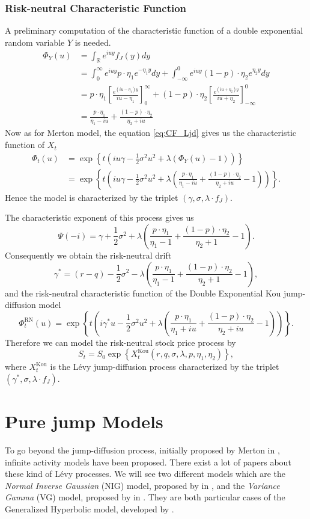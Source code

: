 \subsubsection*{Risk-neutral Characteristic Function}
A preliminary computation of the characteristic function of a double exponential random variable $Y$ is needed.
\begin{align*}
\Phi_Y(u)&=\int_\mathbb{R} e^{iuy}f_J(y) dy\\
&=\int_0^\infty e^{iuy}p\cdot \eta_1e^{-\eta_1 y}dy + \int_{-\infty}^0e^{iuy}(1-p)\cdot\eta_2e^{\eta_2 y}dy\\
&= p\cdot\eta_1\left[\frac{e^{(iu-\eta_1)y}}{iu-\eta_1}\right]_0^\infty+(1-p)\cdot\eta_2\left[\frac{e^{(iu+\eta_2)y}}{iu+\eta_2}\right]_{-\infty}^0\\
&=\frac{p\cdot\eta_1}{\eta_1-iu}+\frac{(1-p)\cdot\eta_2}{\eta_2+iu}
\end{align*}
Now as for Merton model, the equation \eqref{eq:CF_Ljd} gives us the characteristic function of $X_t$
\begin{align*}
\Phi_t(u)&=\exp\left\{t\left(iu\gamma-\frac{1}{2}\sigma^2 u^2 + \lambda\left(\Phi_Y(u)-1\right)\right)\right\}\\
&=\exp\left\{t\left(iu\gamma -\frac{1}{2}\sigma^2u^2 + \lambda\left(\frac{p\cdot\eta_1}{\eta_1-iu}+\frac{(1-p)\cdot\eta_2}{\eta_2+iu}-1\right)\right)\right\}.
\end{align*}
Hence the model is characterized by the triplet $(\gamma,\sigma,\lambda\cdot f_J)$.

The characteristic exponent of this process gives us
$$\Psi(-i) = \gamma + \frac{1}{2}\sigma^2 +\lambda \left(\frac{p\cdot\eta_1}{\eta_1-1}+\frac{(1-p)\cdot\eta_2}{\eta_2+1}-1\right).$$
Consequently we obtain the risk-neutral drift
$$\gamma^\ast = (r-q)- \frac{1}{2}\sigma^2 -\lambda \left(\frac{p\cdot\eta_1}{\eta_1-1}+\frac{(1-p)\cdot\eta_2}{\eta_2+1}-1\right),$$
and the risk-neutral characteristic function of the Double Exponential Kou jump-diffusion model
$$\Phi_t^\text{RN}(u)=\exp\left\{t\left(i\gamma^\ast u -\frac{1}{2}\sigma^2 u^2 +\lambda\left(\frac{p\cdot\eta_1}{\eta_1+iu}+\frac{(1-p)\cdot\eta_2}{\eta_2+iu}-1\right)\right)\right\}.$$
Therefore we can model the risk-neutral stock price process by
$$S_t=S_0\exp\left\{X_t^\text{Kou}(r,q,\sigma,\lambda,p,\eta_1,\eta_2)\right\},$$
where $X_t^\text{Kou}$ is the L\'evy jump-diffusion process characterized by the triplet $(\gamma^\ast,\sigma,\lambda\cdot f_J)$.

\section{Pure jump Models}
\label{sec:models:pure_jump}
To go beyond the jump-diffusion process, initially proposed by Merton in \citeyear{Mer76}, infinite activity models have been proposed. There exist a lot of papers about these kind of L\'evy processes. We will see two different models which are the \textit{Normal Inverse Gaussian} (NIG) model, proposed by \citeauthor{Bar97b} in \citeyear{Bar97b}, and the \textit{Variance Gamma} (VG) model, proposed by \citeauthor{MCC98} in \citeyear{MCC98}. They are both particular cases of the Generalized Hyperbolic model, developed by \citeauthor{EP98} \citeyearpar{EP98}.

